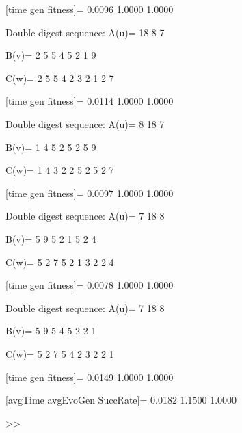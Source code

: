 [time gen fitness]=
    0.0096    1.0000    1.0000

Double digest sequence:
A(u)=
    18     8     7

B(v)=
     2     5     5     4     5     2     1     9

C(w)=
     2     5     5     4     2     3     2     1     2     7

[time gen fitness]=
    0.0114    1.0000    1.0000

Double digest sequence:
A(u)=
     8    18     7

B(v)=
     1     4     5     2     5     2     5     9

C(w)=
     1     4     3     2     2     5     2     5     2     7

[time gen fitness]=
    0.0097    1.0000    1.0000

Double digest sequence:
A(u)=
     7    18     8

B(v)=
     5     9     5     2     1     5     2     4

C(w)=
     5     2     7     5     2     1     3     2     2     4

[time gen fitness]=
    0.0078    1.0000    1.0000

Double digest sequence:
A(u)=
     7    18     8

B(v)=
     5     9     5     4     5     2     2     1

C(w)=
     5     2     7     5     4     2     3     2     2     1

[time gen fitness]=
    0.0149    1.0000    1.0000

[avgTime  avgEvoGen  SuccRate]=
    0.0182    1.1500    1.0000

>> 